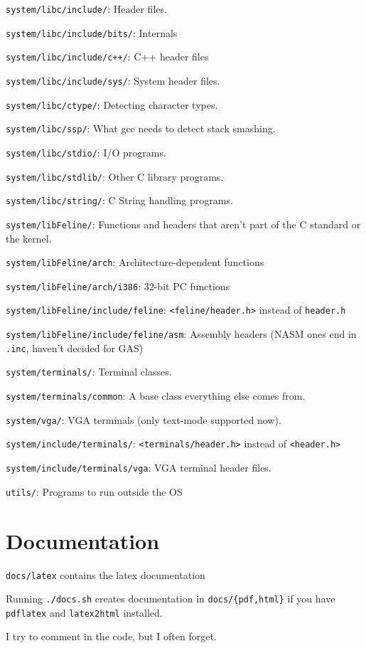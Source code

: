 \documentclass[12pt]{article}
\newcommand{\code}[1]{\colorbox{light-gray}{\texttt{#1}}}
\begin{document}
\begin{list}{}{}
\item \code{system/libc/include/}: Header files.
\item \code{system/libc/include/bits/}: Internals
\item \code{system/libc/include/c++/}: C++ header files
\item \code{system/libc/include/sys/}: System header files.
\item \code{system/libc/ctype/}: Detecting character types.
\item \code{system/libc/ssp/}: What gcc needs to detect stack smashing.
\item \code{system/libc/stdio/}: I/O programs.
\item \code{system/libc/stdlib/}: Other C library programs.
\item \code{system/libc/string/}: C String handling programs.
\item \code{system/libFeline/}: Functions and headers that aren't part of the C standard or the kernel.
\item \code{system/libFeline/arch}: Architecture-dependent functions
\item \code{system/libFeline/arch/i386}: 32-bit PC functions
\item \code{system/libFeline/include/feline}: \code{<feline/header.h>} instead of \code{header.h}
\item \code{system/libFeline/include/feline/asm}: Assembly headers (NASM ones end in \code{.inc}, haven't decided for GAS)
\item \code{system/terminals/}: Terminal classes.
\item \code{system/terminals/common}: A base class everything else comes from.
\item \code{system/vga/}: VGA terminals (only text-mode supported now).
\item \code{system/include/terminals/}: \code{<terminals/header.h>} instead of \code{<header.h>}
\item \code{system/include/terminals/vga}: VGA terminal header files.
\item \code{utils/}: Programs to run outside the OS
\end{list}

\section{Documentation}
\begin{list}{}{}
\item \code{docs/latex} contains the latex documentation
\item Running \code{./docs.sh} creates documentation in \code{docs/\{pdf,html\}} if you have \code{pdflatex} and \code{latex2html} installed.
\item I try to comment in the code, but I often forget.
\end{list}
\end{document}
